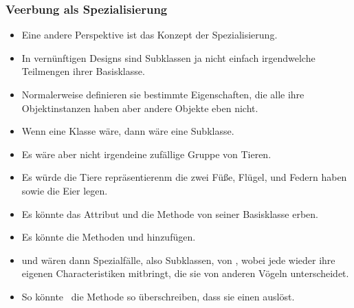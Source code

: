 \documentclass[aspectratio=169,mathserif,notheorems]{beamer}%
\begin{document}
\begin{frame}%
\frametitle{Veerbung als Spezialisierung}%
\begin{itemize}%
\item Eine andere Perspektive ist das Konzept der Spezialisierung.%
%
\item<2-> In vernünftigen Designs sind Subklassen ja nicht einfach irgendwelche Teilmengen ihrer Basisklasse.%
%
\item<3-> Normalerweise definieren sie bestimmte Eigenschaften, die alle ihre Objektinstanzen haben aber andere Objekte eben nicht.%
%
\item<4-> Wenn  eine Klasse wäre, dann wäre  eine Subklasse.%
%
\item<5-> Es wäre aber nicht irgendeine zufällige Gruppe von Tieren.%
%
\item<6-> Es würde die Tiere repräsentierenm die zwei Füße, Flügel, und Federn haben sowie die Eier legen.%
%
\item<7-> Es könnte das Attribut  und die Methode  von seiner Basisklasse  erben.%
%
\item<8-> Es könnte die Methoden  und  hinzufügen.%
%
\item<9->  und  wären dann Spezialfälle, also Subklassen, von , wobei jede wieder ihre eigenen Characteristiken mitbringt, die sie von anderen Vögeln unterscheidet.%
%
\item<10-> So könnte  \DEzB\ die Methode  so überschreiben, dass sie einen  auslöst.%
\end{itemize}%
\end{frame}%
%
\end{document}
